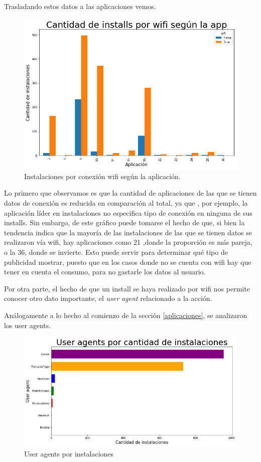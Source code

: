 \documentclass[a4paper, 12pt]{article}
\begin{document}
		Trasladando estos datos a las aplicaciones vemos.

		\FloatBarrier
		\begin{figure}[h]
			\centering
			\includegraphics[width=\textwidth]{images/installs/appswifi.png}
			\caption{Instalaciones por conexión wifi según la aplicación.}
		\end{figure}
		\FloatBarrier

		Lo primero que observamos es que la cantidad de aplicaciones de las que se tienen datos de conexión es reducida en comparación al total, ya que , por ejemplo, la aplicación líder en instalaciones no especifica tipo de conexión en ninguna de sus installs. Sin embargo, de este gráfico puede tomarse el hecho de que, si bien la tendencia indica que la mayoría de las instalaciones de las que se tienen datos se realizaron vía wifi, hay aplicaciones como 21 ,donde la proporción es más pareja, o la 36, donde se invierte. Esto puede servir para determinar qué tipo de publicidad mostrar, puesto que en los casos donde no se cuenta con wifi hay que tener en cuenta el consumo, para no gastarle los datos al usuario.


		Por otra parte, el hecho de que un install se haya realizado por wifi nos permite conocer otro dato importante, el \textit{user agent} relacionado a la acción.

		Análogamente a lo hecho al comienzo de la sección \ref{aplicaciones}, se analizaron los user agents.

		\FloatBarrier
		\begin{figure}[h]
			\centering
			\includegraphics[width=\textwidth]{images/installs/useragents.png}
			\caption{User agents por instalaciones}
		\end{figure}
		\FloatBarrier
\end{document}
